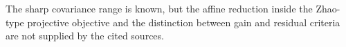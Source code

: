 The sharp covariance range is known, but the affine reduction inside the Zhao-type projective objective and the distinction between gain and residual criteria are not supplied by the cited sources.